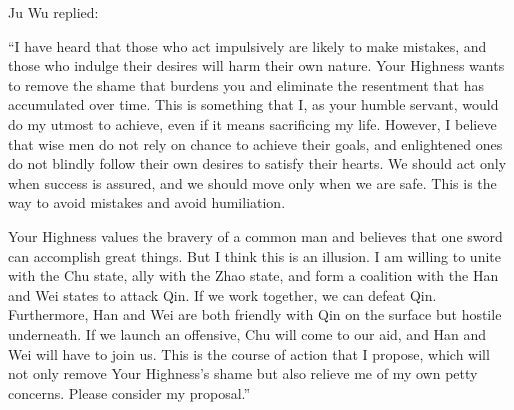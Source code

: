 \documentclass[12pt]{book}
\begin{document}
\begin{pairs}
\begin{Leftside}
\begin{fioesjfsoeifj}
Ju Wu replied:

``I have heard that those who act impulsively are likely to make mistakes, and those who indulge their desires will harm their own nature. Your Highness wants to remove the shame that burdens you and eliminate the resentment that has accumulated over time. This is something that I, as your humble servant, would do my utmost to achieve, even if it means sacrificing my life. However, I believe that wise men do not rely on chance to achieve their goals, and enlightened ones do not blindly follow their own desires to satisfy their hearts. We should act only when success is assured, and we should move only when we are safe. This is the way to avoid mistakes and avoid humiliation.

Your Highness values the bravery of a common man and believes that one sword can accomplish great things. But I think this is an illusion. I am willing to unite with the Chu state, ally with the Zhao state, and form a coalition with the Han and Wei states to attack Qin. If we work together, we can defeat Qin. Furthermore, Han and Wei are both friendly with Qin on the surface but hostile underneath. If we launch an offensive, Chu will come to our aid, and Han and Wei will have to join us. This is the course of action that I propose, which will not only remove Your Highness's shame but also relieve me of my own petty concerns. Please consider my proposal.''
\pend
\endnumbering
\end{fioesjfsoeifj}
\end{Leftside}
\end{pairs}
\Columns
\end{document}
